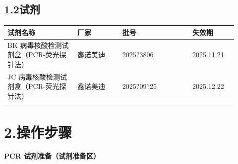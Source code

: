 \documentclass[UTF8,10pt,a4paper,fontset=fandol]{ctexart}
\newcommand{\fieldvalue}[1]{#1}
\newcommand{\handwritten}[1]{#1}
\begin{document}
\subsection*{1.2\quad 试剂}

\begin{tabular}{|p{0.28\linewidth}|p{0.18\linewidth}|p{0.28\linewidth}|p{0.18\linewidth}|}
\hline
试剂名称 & 厂家 & 批号 & 失效期\\
\hline
BK 病毒核酸检测试剂盒（PCR-荧光探针法） &
鑫诺美迪 &
\fieldvalue{\handwritten{2025?3806}} &
\fieldvalue{\handwritten{2025.11.21}}\\
\hline
JC 病毒核酸检测试剂盒（PCR-荧光探针法） &
鑫诺美迪 &
\fieldvalue{\handwritten{2025?09?25}} &
\fieldvalue{\handwritten{2025.12.22}}\\
\hline
\end{tabular}

\section*{2.\quad 操作步骤}

\begin{center}
\textbf{PCR 试剂准备（试剂准备区）}
\end{center}
\end{document}
